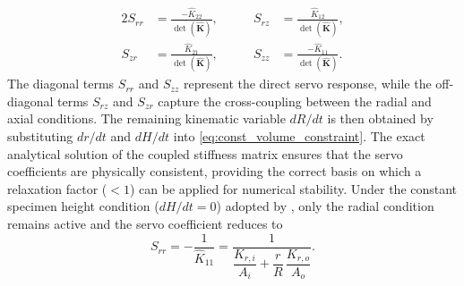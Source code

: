 \documentclass[a4paper,fleqn]{cas-sc}
\begin{document}
\begin{alignat}{2}
S_{rr} &= \frac{-\hat{K}_{22}}{\det(\hat{\mathbf{K}})}, &\qquad
S_{rz} &= \frac{\hat{K}_{12}}{\det(\hat{\mathbf{K}})}, \label{eq:servo_coeff_r}\\[4pt]
S_{zr} &= \frac{\hat{K}_{21}}{\det(\hat{\mathbf{K}})}, &\qquad
S_{zz} &= \frac{-\hat{K}_{11}}{\det(\hat{\mathbf{K}})}. \label{eq:servo_coeff_z}
\end{alignat}
The diagonal terms $S_{rr}$ and $S_{zz}$ represent the direct servo response, while the off-diagonal terms $S_{rz}$ and $S_{zr}$ capture the cross-coupling between the radial and axial conditions. The remaining kinematic variable $dR/dt$ is then obtained by substituting $dr/dt$ and $dH/dt$ into \cref{eq:const_volume_constraint}. The exact analytical solution of the coupled stiffness matrix ensures that the servo coefficients are physically consistent, providing the correct basis on which a relaxation factor ($<1$) can be applied for numerical stability. Under the constant specimen height condition ($dH/dt=0$) adopted by \citet{Han2024jgs}, only the radial condition remains active and the servo coefficient reduces to
\begin{equation}
S_{rr} = -\frac{1}{\hat{K}_{11}} = \frac{1}{\dfrac{K_{r,i}}{A_i}+\dfrac{r}{R}\,\dfrac{K_{r,o}}{A_o}}.
\label{eq:Srr_constantH_main}
\end{equation}
\end{document}
